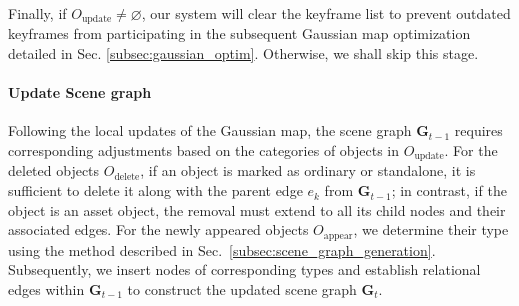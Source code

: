 Finally, if $O_\text{update} \neq \varnothing$, our system will clear the keyframe list to prevent outdated keyframes from participating in the subsequent Gaussian map optimization detailed in Sec. \ref{subsec:gaussian_optim}. Otherwise, we shall skip this stage.



\paragraph{Update Scene graph}
\label{para:update_scene_graph} 

Following the local updates of the Gaussian map, the scene graph $\mathbf{G}_{t-1}$ requires corresponding adjustments based on the categories of objects in $O_\text{update}$. For the deleted objects $O_\text{delete}$, if an object is marked as ordinary or standalone, it is sufficient to delete it along with the parent edge $e_k$ from $\textbf{G}_{t-1}$; in contrast, if the object is an asset object, the removal must extend to all its child nodes and their associated edges. For the newly appeared objects $O_\text{appear}$, we determine their type using the method described in Sec.~\ref{subsec:scene_graph_generation}. Subsequently, we insert nodes of corresponding types and establish relational edges within $\textbf{G}_{t-1}$ to construct the updated scene graph $\textbf{G}_t$.

